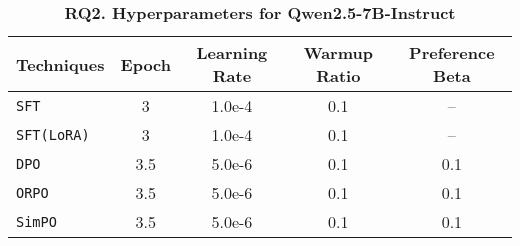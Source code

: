\begin{table}[h]
\small
\setlength{\tabcolsep}{7pt} 
\caption{\textbf{RQ2. Hyperparameters for Qwen2.5-7B-Instruct}}
\centering
\begin{tabular}{l|cccc}
    \toprule
    \textbf{Techniques} & \textbf{Epoch} & \textbf{Learning Rate} & \textbf{Warmup Ratio} & \textbf{Preference Beta} \\
    \midrule
    \texttt{SFT}        & 3   & 1.0e-4 & 0.1 & --   \\
    \texttt{SFT(LoRA)}  & 3   & 1.0e-4 & 0.1 & --   \\
    \texttt{DPO}        & 3.5 & 5.0e-6 & 0.1 & 0.1  \\
    \texttt{ORPO}       & 3.5 & 5.0e-6 & 0.1 & 0.1  \\
    \texttt{SimPO}      & 3.5 & 5.0e-6 & 0.1 & 0.1  \\
    \bottomrule
\end{tabular}
\label{rq2_hparams}
\vspace{-0.5em}
\end{table}




    


